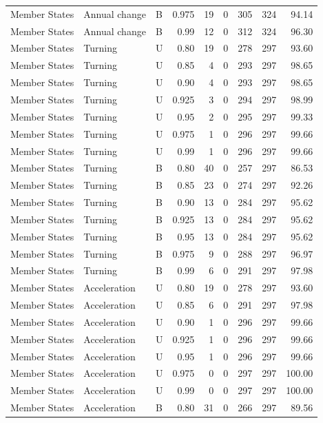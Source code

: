 \begin{longtable}{lllrrrrrr}
Member States & Annual change & B & 0.975 & 19 & 0 & 305 & 324 & 94.14 \\
Member States & Annual change & B & 0.99 & 12 & 0 & 312 & 324 & 96.30 \\
Member States & Turning & U & 0.80 & 19 & 0 & 278 & 297 & 93.60 \\
Member States & Turning & U & 0.85 & 4 & 0 & 293 & 297 & 98.65 \\
Member States & Turning & U & 0.90 & 4 & 0 & 293 & 297 & 98.65 \\
Member States & Turning & U & 0.925 & 3 & 0 & 294 & 297 & 98.99 \\
Member States & Turning & U & 0.95 & 2 & 0 & 295 & 297 & 99.33 \\
Member States & Turning & U & 0.975 & 1 & 0 & 296 & 297 & 99.66 \\
Member States & Turning & U & 0.99 & 1 & 0 & 296 & 297 & 99.66 \\
Member States & Turning & B & 0.80 & 40 & 0 & 257 & 297 & 86.53 \\
Member States & Turning & B & 0.85 & 23 & 0 & 274 & 297 & 92.26 \\
Member States & Turning & B & 0.90 & 13 & 0 & 284 & 297 & 95.62 \\
Member States & Turning & B & 0.925 & 13 & 0 & 284 & 297 & 95.62 \\
Member States & Turning & B & 0.95 & 13 & 0 & 284 & 297 & 95.62 \\
Member States & Turning & B & 0.975 & 9 & 0 & 288 & 297 & 96.97 \\
Member States & Turning & B & 0.99 & 6 & 0 & 291 & 297 & 97.98 \\
Member States & Acceleration & U & 0.80 & 19 & 0 & 278 & 297 & 93.60 \\
Member States & Acceleration & U & 0.85 & 6 & 0 & 291 & 297 & 97.98 \\
Member States & Acceleration & U & 0.90 & 1 & 0 & 296 & 297 & 99.66 \\
Member States & Acceleration & U & 0.925 & 1 & 0 & 296 & 297 & 99.66 \\
Member States & Acceleration & U & 0.95 & 1 & 0 & 296 & 297 & 99.66 \\
Member States & Acceleration & U & 0.975 & 0 & 0 & 297 & 297 & 100.00 \\
Member States & Acceleration & U & 0.99 & 0 & 0 & 297 & 297 & 100.00 \\
Member States & Acceleration & B & 0.80 & 31 & 0 & 266 & 297 & 89.56 \\

\end{longtable}
